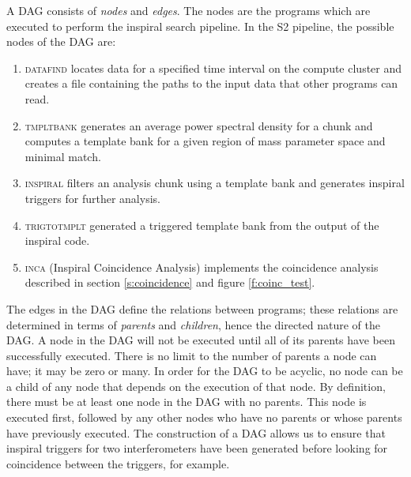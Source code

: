 A DAG consists of \emph{nodes} and \emph{edges}. The nodes are the programs
which are executed to perform the inspiral search pipeline. In the S2
pipeline, the possible nodes of the DAG are:
\begin{enumerate}
\item\textsc{datafind} locates data for a specified time interval on the
compute cluster and creates a file containing the paths to the input data that
other programs can read.

\item\textsc{tmpltbank} generates an average power spectral density for a
chunk and computes a template bank for a given region of mass parameter space
and minimal match.

\item\textsc{inspiral} filters an analysis chunk using a template bank and
generates inspiral triggers for further analysis.

\item\textsc{trigtotmplt} generated a triggered template bank from the
output of the inspiral code.

\item\textsc{inca} (Inspiral Coincidence Analysis) implements the
coincidence analysis described in section \ref{s:coincidence} and figure
\ref{f:coinc_test}.
\end{enumerate}
The edges in the DAG define the relations between programs; these relations
are determined in terms of \emph{parents} and \emph{children}, hence the
directed nature of the DAG. A node in the DAG will not be executed until all
of its parents have been successfully executed. There is no limit to the
number of parents a node can have; it may be zero or many. In order for the
DAG to be acyclic, no node can be a child of any node that depends on the
execution of that node. By definition, there must be at least one node in the
DAG with no parents. This node is executed first, followed by any other nodes
who have no parents or whose parents have previously executed.  The
construction of a DAG allows us to ensure that inspiral triggers for two
interferometers have been generated before looking for coincidence between the
triggers, for example.

